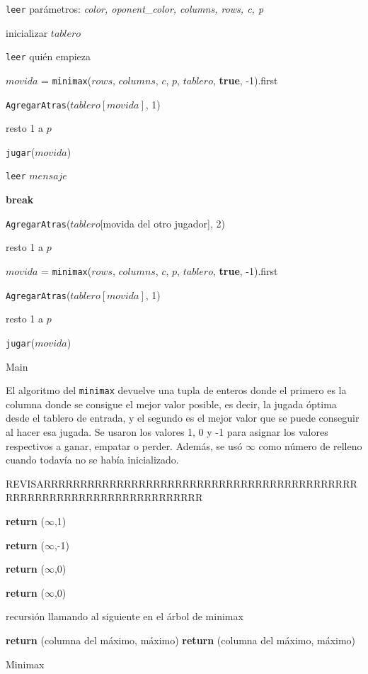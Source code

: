 \documentclass[A4paper,oneside,fleqn,11pt]{article}
\theoremstyle{definition}
\begin{document}
\begin{algorithm}
	\texttt{leer} parámetros: \textit{color, oponent\_color, columns, rows, c, p}
	
    inicializar $tablero$

	\texttt{leer} quién empieza

		{
		$movida$ = \texttt{minimax}($rows$, $columns$, $c$, $p$, $tablero$, \textbf{true}, -1).first

		\texttt{AgregarAtras}($tablero[movida]$, 1)

		resto 1 a $p$

		\texttt{jugar}($movida$)		
		}

    	{
    	\texttt{leer} $mensaje$

        	{
        	\textbf{break}
            }

        \texttt{AgregarAtras}($tablero$[movida del otro jugador], 2)        	

		resto 1 a $p$

        $movida$ = \texttt{minimax}($rows$, $columns$, $c$, $p$, $tablero$, \textbf{true}, -1).first

        \texttt{AgregarAtras}($tablero[movida]$, 1)

        resto 1 a $p$

    	\texttt{jugar}($movida$)
    	}
    \caption{Main}   
\end{algorithm}

El algoritmo del \texttt{minimax} devuelve una tupla de enteros donde el primero es la columna donde se consigue el mejor valor posible, es decir, la jugada óptima desde el tablero de entrada, y el segundo es el mejor valor que se puede conseguir al hacer esa jugada. Se usaron los valores 1, 0 y -1 para asignar los valores respectivos a ganar, empatar o perder. Además, se usó $\infty$ como número de relleno cuando todavía no se había inicializado.

REVISARRRRRRRRRRRRRRRRRRRRRRRRRRRRRRRRRRRRRRRRRRRRRRRRRRRRRRRRRRRRRRRRRRRRRR

\begin{algorithm}


    
			{
			\textbf{return} ($\infty$,1)
			}

			{
			\textbf{return} ($\infty$,-1)
			}

			{
			\textbf{return} ($\infty$,0)
			}

			{
		    \textbf{return} ($\infty$,0)
		    }
		
		recursión llamando al siguiente en el árbol de minimax
		
			{
		    \textbf{return} (columna del máximo, máximo)
			}
			{
		    \textbf{return} (columna del máximo, máximo)
			}

\caption{Minimax}
\end{algorithm}
\end{document}
